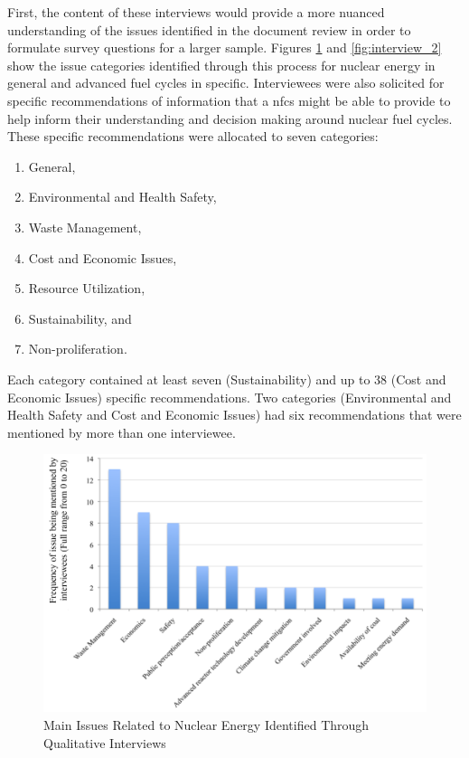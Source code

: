First, the content of these interviews would provide a more nuanced
understanding of the issues identified in the document review in order to
formulate survey questions for a larger sample.  Figures \ref{fig:interview_1}
and \ref{fig:interview_2} show the issue categories identified through this
process for nuclear energy in general and advanced fuel cycles in specific.
Interviewees were also solicited for specific recommendations of information
that a \gls{nfcs} might be able to provide to help inform their understanding
and decision making around nuclear fuel cycles.  These specific
recommendations were allocated to seven categories:
\begin{enumerate}
\item General,
\item Environmental and Health Safety,
\item Waste Management,
\item Cost and Economic Issues,
\item Resource Utilization,
\item Sustainability, and
\item Non-proliferation.
\end{enumerate}

Each category contained at least seven (Sustainability) and up to 38 (Cost and
Economic Issues) specific recommendations.  Two categories (Environmental and
Health Safety and Cost and Economic Issues) had six recommendations that were
mentioned by more than one interviewee.

\begin{figure}[htbp]
  \centering
  \includegraphics[width=0.7\columnwidth]{./images/interview_1}
  \caption{Main Issues Related to Nuclear Energy Identified Through Qualitative Interviews}
  \label{fig:interview_1}
\end{figure}

